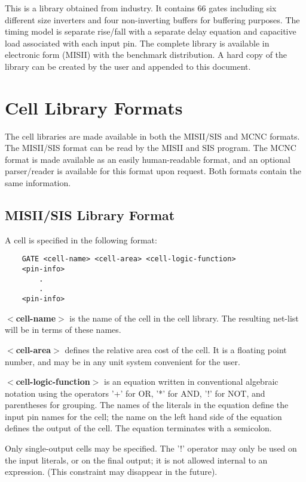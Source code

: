 {\begin{pespace}
This is a library obtained from industry.
It contains 66 gates including six different size inverters and four
non-inverting buffers
for buffering purposes.  The timing model is separate rise/fall with
a separate delay equation and capacitive load associated with each
input pin.
The complete library is available in electronic form (MISII)
with the benchmark distribution.
A hard copy of the library can be created by the user and appended to this
document.



\newpage
\section{Cell Library Formats}

The cell libraries are made available in both the MISII/SIS and MCNC
formats. The MISII/SIS format can be read by the MISII and SIS program. The MCNC format
is made available as an easily human-readable format, and an optional 
parser/reader is available for this format upon request. 
Both formats contain the same information.


\subsection{MISII/SIS Library Format}



A cell is specified in the following format:

\begin{verbatim}
	GATE <cell-name> <cell-area> <cell-logic-function>
	<pin-info>
	    .
	    .
	<pin-info>
\end{verbatim}


{\bf $<$cell-name$>$}
 is the name of the cell in the cell library.  The resulting
net-list will be in terms of these names.

{\bf $<$cell-area$>$}
 defines the relative area cost of the cell.  It is a floating
point number, and may be in any unit system convenient for the user.

{\bf $<$cell-logic-function$>$ }
is an equation written in conventional algebraic
notation using the operators '+' for OR, '*' for AND, '!' for NOT, and
parentheses for grouping.  The names of the literals in the equation
define the input pin names for the cell; the name on the left hand side
of the equation defines the output of the cell.  The equation terminates 
with a semicolon.

Only single-output cells may be specified.  The '!' operator may only
be used on the input literals, or on the final output; it is not
allowed internal to an expression.  (This constraint may disappear in
the future).


\end{pespace}}
